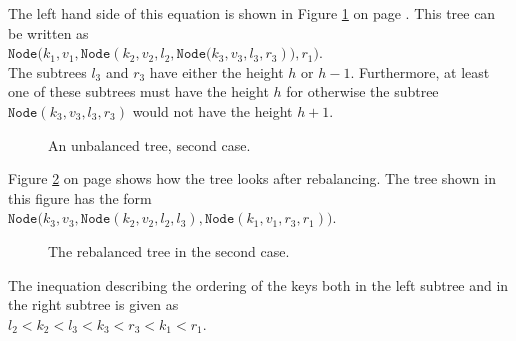 \begin{enumerate}
       The left hand side of this equation is shown in Figure  \ref{fig:caselr} on page
       \pageref{fig:caselr}.  This tree can be written as
       \\[0.2cm]
       \hspace*{1.3cm} 
       $\mathtt{Node}\bigl(k_1,v_1,\mathtt{Node}(k_2,v_2,l_2,\mathtt{Node}\bigl(k_3,v_3,l_3,r_3)\bigr),r_1\bigr)$. 
       \\[0.2cm]
       The subtrees $l_3$ and $r_3$ have either the height  $h$ or $h-1$.  Furthermore, at least one
       of these subtrees must have the height  $h$ for otherwise the subtree
       $\mathtt{Node}(k_3,v_3,l_3,r_3)$ would not have the height $h+1$.
       
\begin{figure}[!ht]
  \centering
  \caption{An unbalanced tree, second case.}
  \label{fig:caselr}
\end{figure}

     Figure \ref{fig:caselr-nach} on page \pageref{fig:caselr-nach} shows how the tree looks after
     rebalancing.  The tree shown in this figure has the form
     \\[0.2cm]
     \hspace*{1.3cm} 
     $\mathtt{Node}\bigl(k_3,v_3,\mathtt{Node}(k_2,v_2,l_2,l_3),\mathtt{Node}(k_1,v_1,r_3,r_1) \bigr)$.


\begin{figure}[!ht]
  \centering
  \caption{The rebalanced tree in the second case.}
  \label{fig:caselr-nach}
\end{figure}

      The inequation describing the ordering of the keys both in the left subtree and in the right
      subtree is given as
      \\[0.2cm]
      \hspace*{1.3cm} $l_2 < k_2 < l_3 < k_3 < r_3 < k_1 < r_1$.


\end{enumerate}
